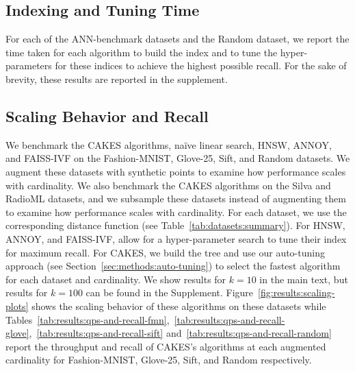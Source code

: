 \subsection{Indexing and Tuning Time}
\label{sec:results:indexing-and-tuning-time}

For each of the ANN-benchmark datasets and the Random dataset, we report the time taken for each algorithm to build the index and to tune the hyper-parameters for these indices to achieve the highest possible recall. For the sake of brevity, these results are reported in the supplement.


\subsection{Scaling Behavior and Recall}
\label{sec:results:scaling-behavior-and-recall}

We benchmark the CAKES algorithms, na\"{i}ve linear search, HNSW, ANNOY, and FAISS-IVF on the Fashion-MNIST, Glove-25, Sift, and Random datasets.
We augment these datasets with synthetic points to examine how performance scales with cardinality.
We also benchmark the CAKES algorithms on the Silva and RadioML datasets, and we subsample these datasets instead of augmenting them to examine how performance scales with cardinality.
For each dataset, we use the corresponding distance function (see Table~\ref{tab:datasets:summary}).
For HNSW, ANNOY, and FAISS-IVF, allow for a hyper-parameter search to tune their index for maximum recall.
For CAKES, we build the tree and use our auto-tuning approach (see Section~\ref{sec:methods:auto-tuning}) to select the fastest algorithm for each dataset and cardinality.
We show results for $k=10$ in the main text, but results for $k=100$ can be found in the Supplement.
Figure~\ref{fig:results:scaling-plots} shows the scaling behavior of these algorithms on these datasets while Tables~\ref{tab:results:qps-and-recall-fmn},~\ref{tab:results:qps-and-recall-glove},~\ref{tab:results:qps-and-recall-sift} and~\ref{tab:results:qps-and-recall-random} report the throughput and recall of CAKES's algorithms at each augmented cardinality for Fashion-MNIST, Glove-25, Sift, and Random respectively.

